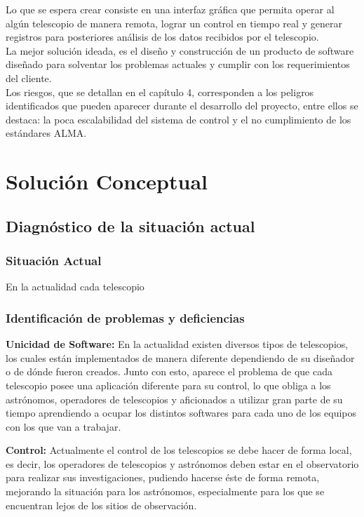 \documentclass[letterpaper,spanish,10pt]{article}
\begin{document}
Lo que se espera crear consiste en una interfaz gr\'afica que permita operar al 
alg\'un telescopio de manera remota, lograr un control en tiempo real y generar 
registros para posteriores an\'alisis de los datos recibidos por el telescopio.\\

La mejor soluci\'on ideada, es el dise\~no y construcci\'on de un producto de software dise\~nado 
para solventar los problemas actuales y cumplir con los requerimientos del cliente.\\

Los riesgos, que se detallan en el cap\'itulo 4, corresponden a los peligros identificados 
que pueden aparecer durante el desarrollo del proyecto, entre ellos se destaca: la poca 
escalabilidad del sistema de control y el no cumplimiento de los est\'andares ALMA.




\newpage
\section{Soluci\'on Conceptual} %
\subsection{Diagn\'ostico de la situaci\'on actual}
\subsubsection{Situaci\'on Actual}
En la actualidad cada telescopio 



\subsubsection{Identificaci\'on de problemas y deficiencias}
\textbf{Unicidad de Software:} En la actualidad existen diversos tipos de telescopios, 
los cuales est\'an implementados de manera diferente dependiendo de su dise\~nador o 
de d\'onde fueron creados. Junto con esto, aparece el problema de que cada telescopio 
posee una aplicaci\'on diferente para su control, lo que obliga a los astr\'onomos, 
operadores de telescopios y aficionados a utilizar gran parte de su tiempo aprendiendo 
a ocupar los distintos softwares para cada uno de los equipos con los que van a trabajar.

\textbf{Control:} Actualmente el control de los telescopios se debe hacer de forma local, 
es decir, los operadores de telescopios y astr\'onomos deben estar en el observatorio 
para realizar sus investigaciones, pudiendo hacerse \'este de forma remota, mejorando 
la situaci\'on para los astr\'onomos, especialmente para los que se encuentran lejos 
de los sitios de observaci\'on.
\end{document}
